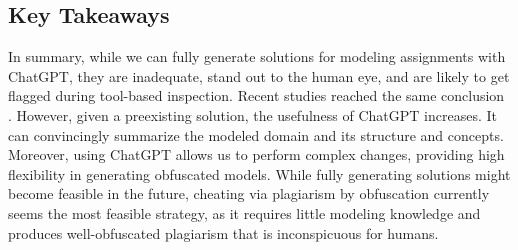 
\subsection{Key Takeaways}

In summary, while we can fully generate solutions for modeling assignments with ChatGPT, they are inadequate, stand out to the human eye, and are likely to get flagged during tool-based inspection.
Recent studies reached the same conclusion \cite{Camara2023}.
However, given a preexisting solution, the usefulness of ChatGPT increases. It can convincingly summarize the modeled domain and its structure and concepts. Moreover, using ChatGPT allows us to perform complex changes, providing high flexibility in generating obfuscated models.
%
While fully generating solutions might become feasible in the future, cheating via plagiarism by obfuscation currently seems the most feasible strategy, as it requires little modeling knowledge and produces well-obfuscated plagiarism that is inconspicuous for humans.

